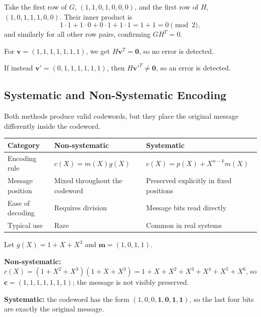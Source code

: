 \begin{example}
Take the first row of \(G\), \((1,1,0,1,0,0,0)\), and the first row of \(H\), \((1,0,1,1,1,0,0)\). Their inner product is
\[1\cdot 1 + 1\cdot 0 + 0\cdot 1 + 1\cdot 1 = 1+1=0 \pmod{2},\]
and similarly for all other row pairs, confirming \(GH^T=0\).
\end{example}

\begin{example}
For \(\mathbf{v}=(1,1,1,1,1,1,1)\), we get \(H\mathbf{v}^T = \mathbf{0}\), so no error is detected.

If instead \(\mathbf{v}'=(0,1,1,1,1,1,1)\), then \(H\mathbf{v}'^T \neq \mathbf{0}\), so an error is detected.
\end{example}

\newpage
\subsection{Systematic and Non-Systematic Encoding}

Both methods produce valid codewords, but they place the original message differently inside the codeword.

\begin{center}
\renewcommand{\arraystretch}{1.2}
\begin{tabular}{@{}p{2.5cm}p{5.5cm}p{5.5cm}@{}}
	\toprule
	\textbf{Category} & \textbf{Non-systematic} & \textbf{Systematic} \\
	\midrule
	Encoding rule & \(c(X)=m(X)g(X)\) & \(c(X)=p(X)+X^{n-k}m(X)\) \\
	Message position & Mixed throughout the codeword & Preserved explicitly in fixed positions \\
	Ease of decoding & Requires division & Message bits read directly \\
	Typical use & Rare & Common in real systems \\
	\bottomrule
\end{tabular}
\end{center}

\begin{example}
Let \(g(X)=1+X+X^3\) and \(\mathbf{m}=(1,0,1,1)\).

\textbf{Non-systematic:} \(c(X)=(1+X^2+X^3)(1+X+X^3)=1+X+X^2+X^3+X^4+X^5+X^6\), so \(\mathbf{c}=(1,1,1,1,1,1,1)\); the message is not visibly preserved.

\textbf{Systematic:} the codeword has the form \((1,0,0,\mathbf{1,0,1,1})\), so the last four bits are exactly the original message.
\end{example}

